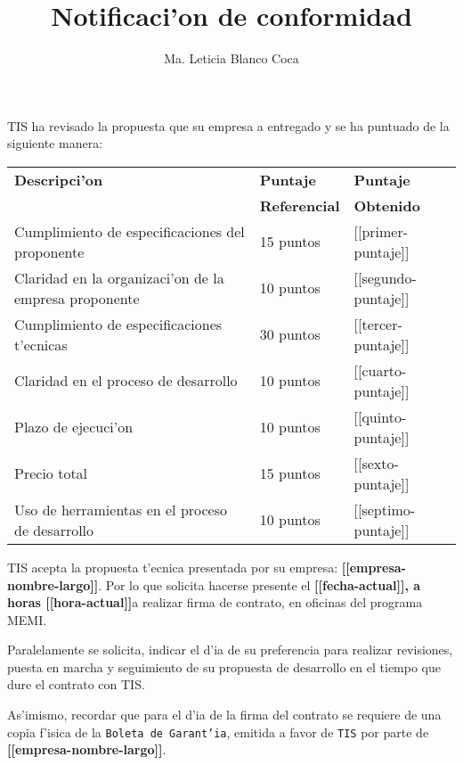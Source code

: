 \documentclass[10pt,letterpaper,twoside]{article}
\newcommand{\empresa}[0]{\textbf{[[empresa-nombre-largo]]}}
\newcommand{\diayhora}[0]{\textbf{[[fecha-actual]], a horas [[hora-actual]]}}
\newcommand{\pp}[0]{[[primer-puntaje]]}
\newcommand{\sep}[0]{[[segundo-puntaje]]}
\newcommand{\tp}[0]{[[tercer-puntaje]]}
\newcommand{\cp}[0]{[[cuarto-puntaje]]}
\newcommand{\qp}[0]{[[quinto-puntaje]]}
\newcommand{\ssp}[0]{[[sexto-puntaje]]}
\newcommand{\sssp}[0]{[[septimo-puntaje]]}
\begin{document}
\title{Notificaci'on de conformidad}
\author{Ma. Leticia Blanco Coca}
\maketitle

TIS ha revisado la propuesta que su empresa a entregado y se ha puntuado de la siguiente manera:

\begin{tabular}{|l|l|l|}
\hline \textbf{Descripci'on}& \textbf{Puntaje}&\textbf{Puntaje} \\
& \textbf{Referencial}&\textbf{Obtenido} \\
\hline
\hline Cumplimiento de especificaciones del proponente       & 15 puntos & \pp \\
\hline Claridad en la organizaci'on de la empresa proponente & 10 puntos & \sep \\
\hline Cumplimiento de especificaciones t'ecnicas            & 30 puntos & \tp \\ 
\hline Claridad en el proceso de desarrollo                  & 10 puntos & \cp\\
\hline Plazo de ejecuci'on                                   & 10 puntos & \qp \\
\hline Precio total                                          & 15 puntos & \ssp \\
\hline Uso de herramientas en el proceso de desarrollo       & 10 puntos & \sssp \\
\hline
\end{tabular}

TIS acepta la propuesta t'ecnica presentada por su empresa: \empresa. Por lo que solicita 
hacerse presente el \diayhora a realizar firma de contrato,
en oficinas del programa MEMI.

Paralelamente se solicita, indicar el d'ia de su preferencia para realizar revisiones, puesta
en marcha  y 
seguimiento de su propuesta de desarrollo en el tiempo que dure el contrato con TIS.


As'imismo, recordar que para el d'ia de la firma del contrato se requiere de una copia f'isica
 de la 
\texttt{Boleta de Garant'ia}, emitida a favor de \texttt{TIS} por parte de \empresa.
\end{document}
